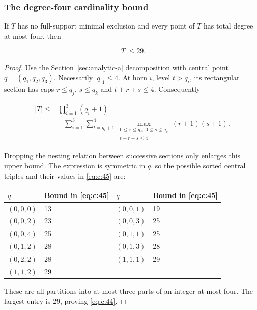 \subsubsection{The degree-four cardinality bound}


\begin{lemma}\label{lemma:c:7.1}

If \(T\) has no full-support minimal exclusion and every point of \(T\) has
total degree at most four, then

\begin{equation}
|T|\le29.
\label{eq:c:44}
\end{equation}

\end{lemma}
\begin{proof}

Use the Section~\ref{sec:analytic-a} decomposition with central point
\(q=(q_1,q_2,q_3)\). Necessarily \(|q|_1\le4\). At horn \(i\), level
\(t>q_i\), its rectangular section has caps \(r\le q_j\), \(s\le q_k\) and
\(t+r+s\le4\). Consequently

\begin{equation}
\begin{aligned}
|T|\le{}&\prod_{i=1}^3(q_i+1)\\
&+\sum_{i=1}^3\sum_{t=q_i+1}^4
\max_{\substack{0\le r\le q_j,\ 0\le s\le q_k\\t+r+s\le4}}
(r+1)(s+1).
\end{aligned}
\label{eq:c:45}
\end{equation}

Dropping the nesting relation between successive sections only enlarges this
upper bound. The expression is symmetric in \(q\), so the possible sorted
central triples and their values in \eqref{eq:c:45} are:

\begin{center}
\small
\begin{tabular}{@{}llll@{}}
\toprule
\(q\) & Bound in \eqref{eq:c:45} & \(q\) & Bound in \eqref{eq:c:45} \\
\midrule
\((0,0,0)\) & 13 & \((0,0,1)\) & 19 \\
\((0,0,2)\) & 23 & \((0,0,3)\) & 25 \\
\((0,0,4)\) & 25 & \((0,1,1)\) & 25 \\
\((0,1,2)\) & 28 & \((0,1,3)\) & 28 \\
\((0,2,2)\) & 28 & \((1,1,1)\) & 29 \\
\((1,1,2)\) & 29 &  &  \\
\bottomrule
\end{tabular}
\end{center}

These are all partitions into at most three parts of an integer at most four.
The largest entry is \(29\), proving \eqref{eq:c:44}.
\end{proof}
